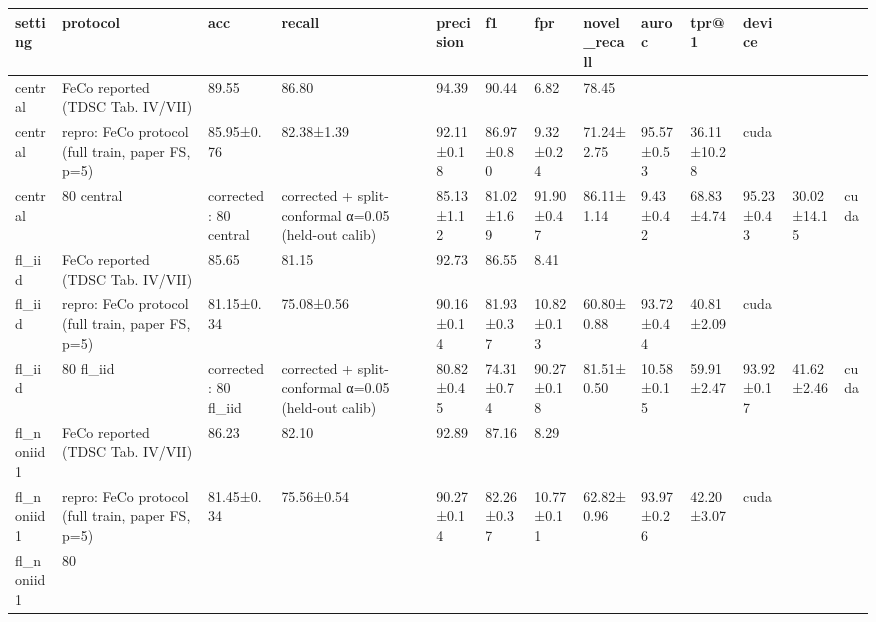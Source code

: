 \begin{tabular}{lllllllllll}
\toprule
setting & protocol & acc & recall & precision & f1 & fpr & novel_recall & auroc & tpr@1 & device \\
\midrule
central & FeCo reported (TDSC Tab. IV/VII) & 89.55 & 86.80 & 94.39 & 90.44 & 6.82 & 78.45 &  &  &  \\
central & repro: FeCo protocol (full train, paper FS, p=5) & 85.95±0.76 & 82.38±1.39 & 92.11±0.18 & 86.97±0.80 & 9.32±0.24 & 71.24±2.75 & 95.57±0.53 & 36.11±10.28 & cuda \\
central & 80%
central & corrected: 80%
central & corrected + split-conformal α=0.05 (held-out calib) & 85.13±1.12 & 81.02±1.69 & 91.90±0.47 & 86.11±1.14 & 9.43±0.42 & 68.83±4.74 & 95.23±0.43 & 30.02±14.15 & cuda \\
fl_iid & FeCo reported (TDSC Tab. IV/VII) & 85.65 & 81.15 & 92.73 & 86.55 & 8.41 &  &  &  &  \\
fl_iid & repro: FeCo protocol (full train, paper FS, p=5) & 81.15±0.34 & 75.08±0.56 & 90.16±0.14 & 81.93±0.37 & 10.82±0.13 & 60.80±0.88 & 93.72±0.44 & 40.81±2.09 & cuda \\
fl_iid & 80%
fl_iid & corrected: 80%
fl_iid & corrected + split-conformal α=0.05 (held-out calib) & 80.82±0.45 & 74.31±0.74 & 90.27±0.18 & 81.51±0.50 & 10.58±0.15 & 59.91±2.47 & 93.92±0.17 & 41.62±2.46 & cuda \\
fl_noniid1 & FeCo reported (TDSC Tab. IV/VII) & 86.23 & 82.10 & 92.89 & 87.16 & 8.29 &  &  &  &  \\
fl_noniid1 & repro: FeCo protocol (full train, paper FS, p=5) & 81.45±0.34 & 75.56±0.54 & 90.27±0.14 & 82.26±0.37 & 10.77±0.11 & 62.82±0.96 & 93.97±0.26 & 42.20±3.07 & cuda \\
fl_noniid1 & 80%

\end{tabular}
